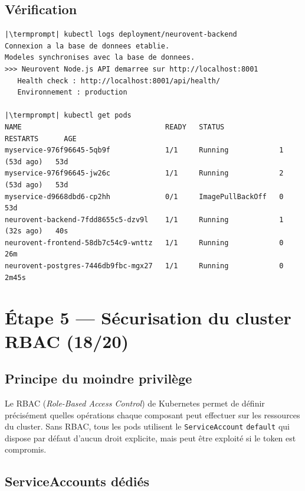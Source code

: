 \documentclass[12pt,a4paper]{article}
\makeatletter
\newcommand{\termprompt}{%
  \textcolor{termgreen}{\textbf{azouaou@Az-zou}}%
  \textcolor{termfg}{:}%
  \textcolor{termcyan}{\textasciitilde/NeuroVent}%
  \textcolor{termfg}{\$}}
\makeatother
\begin{document}
\subsection{Vérification}

\begin{lstlisting}[style=terminal, caption={Vérification de la connexion PostgreSQL}]
|\termprompt| kubectl logs deployment/neurovent-backend
Connexion a la base de donnees etablie.
Modeles synchronises avec la base de donnees.
>>> Neurovent Node.js API demarree sur http://localhost:8001
   Health check : http://localhost:8001/api/health/
   Environnement : production

|\termprompt| kubectl get pods
NAME                                  READY   STATUS             RESTARTS      AGE
myservice-976f96645-5qb9f             1/1     Running            1 (53d ago)   53d
myservice-976f96645-jw26c             1/1     Running            2 (53d ago)   53d
myservice-d9668dbd6-cp2hh             0/1     ImagePullBackOff   0             53d
neurovent-backend-7fdd8655c5-dzv9l    1/1     Running            1 (32s ago)   40s
neurovent-frontend-58db7c54c9-wnttz   1/1     Running            0             26m
neurovent-postgres-7446db9fbc-mgx27   1/1     Running            0             2m45s
\end{lstlisting}

\section{Étape 5 — Sécurisation du cluster RBAC (18/20)}

\subsection{Principe du moindre privilège}

Le RBAC (\textit{Role-Based Access Control}) de Kubernetes permet de définir précisément
quelles opérations chaque composant peut effectuer sur les ressources du cluster.
Sans RBAC, tous les pods utilisent le \texttt{ServiceAccount} \texttt{default} qui
dispose par défaut d'aucun droit explicite, mais peut être exploité si le token est compromis.

\subsection{ServiceAccounts dédiés}
\end{document}
